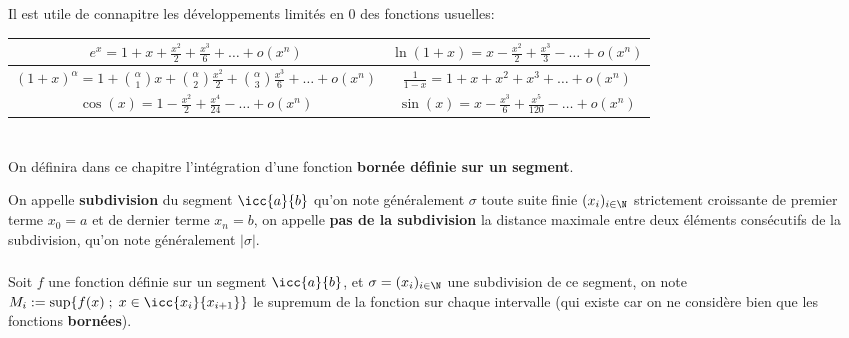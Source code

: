 \subsection*{}

Il est utile de connapitre les développements limités en \(0\) des fonctions usuelles:
\begin{center}
   \renewcommand{\arraystretch}{1.5}%
   \begin{tabular}{| c | c |}
   \hline
   \(e^x = 1 + x + \frac{x^2}{2} + \frac{x^3}{6} + \ldots + o(x^n)\) & \(\ln(1 + x) = x - \frac{x^2}{2} + \frac{x^3}{3} - \ldots + o(x^n) \)\\[1.5ex]
   \hline
   \((1+x)^\alpha = 1 + \binom{\alpha}{1} x + \binom{\alpha}{2}\frac{x^2}{2} + \binom{\alpha}{3}\frac{x^3}{6} + \ldots + o(x^n)\) & \(\frac{1}{1-x} = 1 + x + x^2 + x^3 + \ldots + o(x^n)\) \\[1.5ex]
   \hline
   \(\cos(x) = 1 - \frac{x^2}{2} + \frac{x^4}{24} - \ldots + o(x^n)\) & \(\sin(x) = x - \frac{x^3}{6} + \frac{x^5}{120} - \ldots + o(x^n)\) \\[1.5ex]   
   \hline
   \end{tabular}
\end{center} 

\chapter*{} %

On définira dans ce chapitre l'intégration d'une fonction \textbf{bornée définie sur un segment}.\<

On appelle \textbf{subdivision} du segment \(\icc{a}{b}\) qu'on note généralement \(\sigma\) toute suite finie \((x_i)_{i \in \N}\) strictement croissante de premier terme \(x_0 = a\) et de dernier terme \(x_n = b\), on appelle \textbf{pas de la subdivision} la distance maximale entre deux éléments consécutifs de la subdivision, qu'on note généralement \(|\sigma|\).

\subsection*{}

Soit \(f\) une fonction définie sur un segment \(\icc{a}{b}\), et \(\sigma = (x_i)_{i \in \N}\) une subdivision de ce segment, on note \(M_i := \sup\{f(x) \; ; \; x \in \icc{x_i}{x_{i+1}}\}\) le supremum de la fonction sur chaque intervalle (qui existe car on ne considère bien que les fonctions \textbf{bornées}).\<

